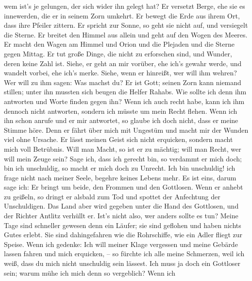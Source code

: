 wem ist's je gelungen, der sich wider ihn gelegt hat?  Er
versetzt Berge, ehe sie es innewerden, die er in seinem Zorn umkehrt.
 Er bewegt die Erde aus ihrem Ort, dass ihre Pfeiler
zittern.  Er spricht zur Sonne, so geht sie nicht auf, und
versiegelt die Sterne.  Er breitet den Himmel aus allein und
geht auf den Wogen des Meeres.  Er macht den Wagen am Himmel
und Orion und die Plejaden und die Sterne gegen Mittag.  Er
tut große Dinge, die nicht zu erforschen sind, und Wunder, deren keine
Zahl ist.  Siehe, er geht an mir vorüber, ehe ich's gewahr
werde, und wandelt vorbei, ehe ich's merke.  Siehe, wenn er
hinreißt, wer will ihm wehren? Wer will zu ihm sagen: Was machst du?
 Er ist Gott; seinen Zorn kann niemand stillen; unter ihn
mussten sich beugen die Helfer Rahabs.  Wie sollte ich denn
ihm antworten und Worte finden gegen ihn?  Wenn ich auch
recht habe, kann ich ihm dennoch nicht antworten, sondern ich müsste um
mein Recht flehen.  Wenn ich ihn schon anrufe und er mir
antwortet, so glaube ich doch nicht, dass er meine Stimme höre.
 Denn er fährt über mich mit Ungestüm und macht mir der
Wunden viel ohne Ursache.  Er lässt meinen Geist sich nicht
erquicken, sondern macht mich voll Betrübnis.  Will man
Macht, so ist er zu mächtig; will man Recht, wer will mein Zeuge sein?
 Sage ich, dass ich gerecht bin, so verdammt er mich doch;
bin ich unschuldig, so macht er mich doch zu Unrecht.  Ich
bin unschuldig! ich frage nicht nach meiner Seele, begehre keines Lebens
mehr.  Es ist eins, darum sage ich: Er bringt um beide, den
Frommen und den Gottlosen.  Wenn er anhebt zu geißeln, so
dringt er alsbald zum Tod und spottet der Anfechtung der Unschuldigen.
 Das Land aber wird gegeben unter die Hand des Gottlosen,
und der Richter Antlitz verhüllt er. Ist's nicht also, wer anders sollte
es tun?  Meine Tage sind schneller gewesen denn ein Läufer;
sie sind geflohen und haben nichts Gutes erlebt.  Sie sind
dahingefahren wie die Rohrschiffe, wie ein Adler fliegt zur Speise.
 Wenn ich gedenke: Ich will meiner Klage vergessen und
meine Gebärde lassen fahren und mich erquicken, --  so
fürchte ich alle meine Schmerzen, weil ich weiß, dass du mich nicht
unschuldig sein lässest.  Ich muss ja doch ein Gottloser
sein; warum mühe ich mich denn so vergeblich?  Wenn ich
